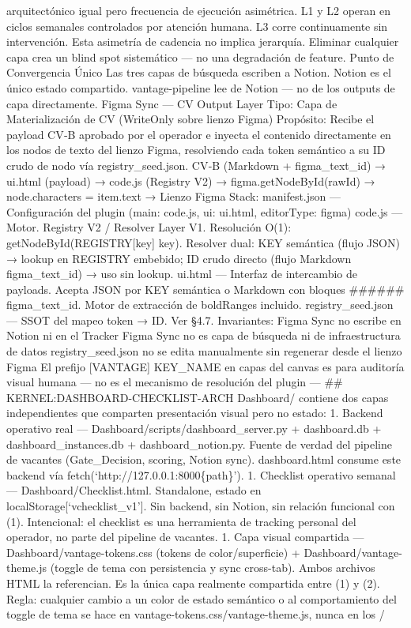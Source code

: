 \documentclass[
]{article}
\begin{document}
arquitectónico igual pero frecuencia de ejecución asimétrica. L1 y L2
operan en ciclos semanales controlados por atención humana. L3 corre
continuamente sin intervención. Esta asimetría de cadencia no implica
jerarquía. Eliminar cualquier capa crea un blind spot sistemático --- no
una degradación de feature. Punto de Convergencia Único Las tres capas
de búsqueda escriben a Notion. Notion es el único estado compartido.
vantage-pipeline lee de Notion --- no de los outputs de capa
directamente. Figma Sync --- CV Output Layer Tipo: Capa de
Materialización de CV (WriteOnly sobre lienzo Figma) Propósito: Recibe
el payload CV‑B aprobado por el operador e inyecta el contenido
directamente en los nodos de texto del lienzo Figma, resolviendo cada
token semántico a su ID crudo de nodo vía registry\_seed.json. CV‑B
(Markdown + figma\_text\_id) → ui.html (payload) → code.js (Registry V2)
→ figma.getNodeById(rawId) → node.characters = item.text → Lienzo Figma
Stack: manifest.json --- Configuración del plugin (main: code.js, ui:
ui.html, editorType: figma) code.js --- Motor. Registry V2 / Resolver
Layer V1. Resolución O(1): getNodeById(REGISTRY{[}key{]}
\textbar\textbar{} key). Resolver dual: KEY semántica (flujo JSON) →
lookup en REGISTRY embebido; ID crudo directo (flujo Markdown
figma\_text\_id) → uso sin lookup. ui.html --- Interfaz de intercambio
de payloads. Acepta JSON por KEY semántica o Markdown con bloques
\#\#\#\#\#\# figma\_text\_id. Motor de extracción de boldRanges
incluido. registry\_seed.json --- SSOT del mapeo token → ID. Ver §4.7.
Invariantes: Figma Sync no escribe en Notion ni en el Tracker Figma Sync
no es capa de búsqueda ni de infraestructura de datos
registry\_seed.json no se edita manualmente sin regenerar desde el
lienzo Figma El prefijo {[}VANTAGE{]} KEY\_NAME en capas del canvas es
para auditoría visual humana --- no es el mecanismo de resolución del
plugin --- \#\# KERNEL:DASHBOARD-CHECKLIST-ARCH Dashboard/ contiene dos
capas independientes que comparten presentación visual pero no estado:
1. Backend operativo real --- Dashboard/scripts/dashboard\_server.py +
dashboard.db + dashboard\_instances.db + dashboard\_notion.py. Fuente de
verdad del pipeline de vacantes (Gate\_Decision, scoring, Notion sync).
dashboard.html consume este backend vía
fetch(`http://127.0.0.1:8000\{path\}'). 1. Checklist operativo semanal
--- Dashboard/Checklist.html. Standalone, estado en
localStorage{[}`vchecklist\_v1'{]}. Sin backend, sin Notion, sin
relación funcional con (1). Intencional: el checklist es una herramienta
de tracking personal del operador, no parte del pipeline de vacantes. 1.
Capa visual compartida --- Dashboard/vantage-tokens.css (tokens de
color/superficie) + Dashboard/vantage-theme.js (toggle de tema con
persistencia y sync cross-tab). Ambos archivos HTML la referencian. Es
la única capa realmente compartida entre (1) y (2). Regla: cualquier
cambio a un color de estado semántico o al comportamiento del toggle de
tema se hace en vantage-tokens.css/vantage-theme.js, nunca en los /
\end{document}
